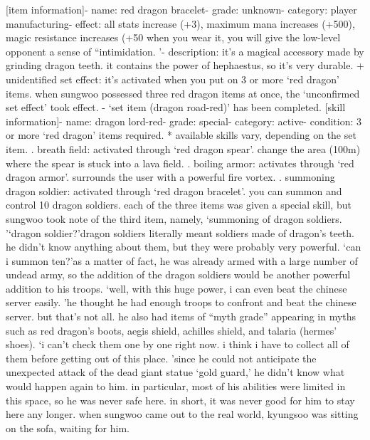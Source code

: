[item information]- name: red dragon bracelet- grade: unknown- category: player manufacturing- effect: all stats increase (+3), maximum mana increases (+500), magic resistance increases (+50%
 when you wear it, you will give the low-level opponent a sense of “intimidation.
’- description: it’s a magical accessory made by grinding dragon teeth.
 it contains the power of hephaestus, so it’s very durable.
+ unidentified set effect: it’s activated when you put on 3 or more ‘red dragon’ items.
when sungwoo possessed three red dragon items at once, the ‘unconfirmed set effect’ took effect.
- ‘set item (dragon road-red)’ has been completed.
[skill information]- name: dragon lord-red- grade: special- category: active- condition: 3 or more ‘red dragon’ items required.
* available skills vary, depending on the set item.
.
 breath field: activated through ‘red dragon spear’.
 change the area (100m) where the spear is stuck into a lava field.
.
 boiling armor: activates through ‘red dragon armor’.
 surrounds the user with a powerful fire vortex.
.
 summoning dragon soldier: activated through ‘red dragon bracelet’.
 you can summon and control 10 dragon soldiers.
each of the three items was given a special skill, but sungwoo took note of the third item, namely, ‘summoning of dragon soldiers.
’‘dragon soldier?’dragon soldiers literally meant soldiers made of dragon’s teeth.
 he didn’t know anything about them, but they were probably very powerful.
‘can i summon ten?’as a matter of fact, he was already armed with a large number of undead army, so the addition of the dragon soldiers would be another powerful addition to his troops.
‘well, with this huge power, i can even beat the chinese server easily.
’he thought he had enough troops to confront and beat the chinese server.
 but that’s not all.
he also had items of “myth grade” appearing in myths such as red dragon’s boots, aegis shield, achilles shield, and talaria (hermes’ shoes).
‘i can’t check them one by one right now.
 i think i have to collect all of them before getting out of this place.
’since he could not anticipate the unexpected attack of the dead giant statue ‘gold guard,’ he didn’t know what would happen again to him.
in particular, most of his abilities were limited in this space, so he was never safe here.
 in short, it was never good for him to stay here any longer.
when sungwoo came out to the real world, kyungsoo was sitting on the sofa, waiting for him.


